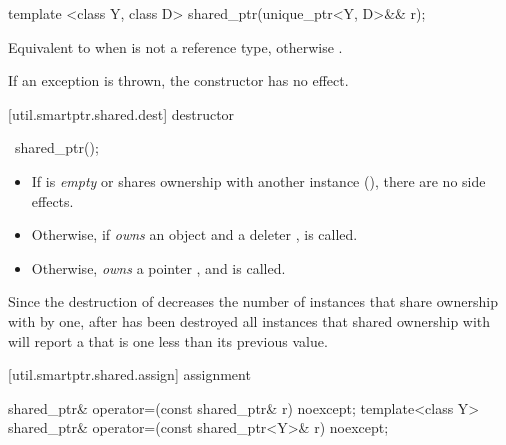 %
%
\begin{itemdecl}
template <class Y, class D> shared_ptr(unique_ptr<Y, D>&& r);
\end{itemdecl}

\begin{itemdescr}
\pnum
\effects Equivalent to  when
 is not a reference type, otherwise .

\pnum
\exceptionsafety If an exception is thrown, the constructor has no effect.
\end{itemdescr}

[util.smartptr.shared.dest]{ destructor}

%
\begin{itemdecl}
~shared_ptr();
\end{itemdecl}

\begin{itemdescr}
\pnum\effects
\begin{itemize}
\item If  is \textit{empty} or shares ownership with another
 instance (), there are no side effects.

\item
Otherwise, if  \textit{owns} an object
 and a deleter ,  is called.

\item Otherwise,  \textit{owns} a pointer ,
and  is called.
\end{itemize}
\end{itemdescr}

\pnum
\enternote Since the destruction of 
decreases the number of instances that share ownership with 
by one,
after  has been destroyed
all  instances that shared ownership with
 will report a  that is one less
than its previous value. \exitnote

[util.smartptr.shared.assign]{ assignment}

%
%
\begin{itemdecl}
shared_ptr& operator=(const shared_ptr& r) noexcept;
template<class Y> shared_ptr& operator=(const shared_ptr<Y>& r) noexcept;
\end{itemdecl}

